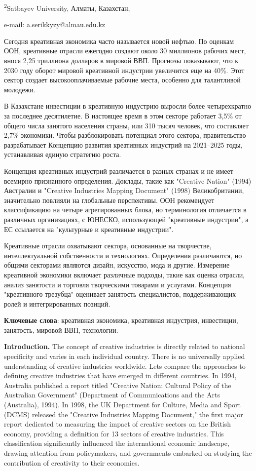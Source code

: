 \textsuperscript{2}Satbayev University, Алматы, Казахстан,

e-mail: a.serikkyzy@almau.edu.kz

Сегодня креативная экономика часто называется новой нефтью. По оценкам
ООН, креативные отрасли ежегодно создают около 30 миллионов рабочих
мест, внося 2,25 триллиона долларов в мировой ВВП. Прогнозы показывают,
что к 2030 году оборот мировой креативной индустрии увеличится еще на
40\%. Этот сектор создает высокооплачиваемые рабочие места, особенно для
талантливой молодежи.

В Казахстане инвестиции в креативную индустрию выросли более
четырехкратно за последнее десятилетие. В настоящее время в этом секторе
работает 3,5\% от общего числа занятого населения страны, или 310 тысяч
человек, что составляет 2,7\% экономики. Чтобы разблокировать потенциал
этого сектора, правительство разрабатывает Концепцию развития креативных
индустрий на 2021--2025 годы, устанавливая единую стратегию роста.

Концепция креативных индустрий различается в разных странах и не имеет
всемирно признанного определения. Доклады, такие как "Creative Nation"
(1994) Австралии и "Creative Industries Mapping Document" (1998)
Великобритании, значительно повлияли на глобальные перспективы. ООН
рекомендует классификацию на четыре агрегированных блока, но
терминология отличается в различных организациях, с ЮНЕСКО, использующей
"креативные индустрии", а ЕС ссылается на "культурные и креативные
индустрии".

Креативные отрасли охватывают сектора, основанные на творчестве,
интеллектуальной собственности и технологиях. Определения различаются,
но общими секторами являются дизайн, искусство, мода и другие. Измерение
креативной экономики включает различные подходы, такие как оценка
отрасли, анализ занятости и торговля творческими товарами и услугами.
Концепция "креативного трезубца" оценивает занятость специалистов,
поддерживающих ролей и интегрированных позиций.

{\bfseries Ключевые слова}: креативная экономика, креативная индустрия,
инвестиции, занятость, мировой ВВП, технологии.

{\bfseries Introduction.} The concept of creative industries is directly
related to national specificity and varies in each individual country.
There is no universally applied understanding of creative industries
worldwide. Let\textquotesingle s compare the approaches to defining
creative industries that have emerged in different countries. In 1994,
Australia published a report titled "Creative Nation: Cultural Policy of
the Australian Government" (Department of Communications and the Arts
(Australia), 1994). In 1998, the UK Department for Culture, Media and
Sport (DCMS) released the "Creative Industries Mapping Document," the
first major report dedicated to measuring the impact of creative sectors
on the British economy, providing a definition for 13 sectors of
creative industries. This classification significantly influenced the
international economic landscape, drawing attention from policymakers,
and governments embarked on studying the contribution of creativity to
their economies.

